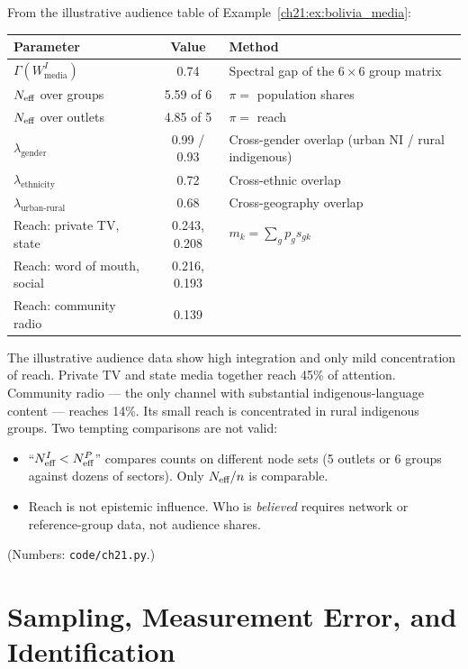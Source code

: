 \documentclass[../structural_economics_book.tex]{subfiles}
\begin{document}
\begin{example}\label{ch21:ex:parameters}
From the illustrative audience table of Example~\ref{ch21:ex:bolivia_media}:
\begin{center}
\small
\begin{tabularx}{\textwidth}{lcL}
\toprule
Parameter & Value & Method \\
\midrule
$\Gamma(W^I_{\text{media}})$ & 0.74 & Spectral gap of the $6 \times 6$ group matrix \\
$N_{\text{eff}}$ over groups & 5.59 of 6 & $\pi = $ population shares \\
$N_{\text{eff}}$ over outlets & 4.85 of 5 & $\pi = $ reach \\
$\lambda_{\text{gender}}$ & 0.99 / 0.93 & Cross-gender overlap (urban NI / rural indigenous) \\
$\lambda_{\text{ethnicity}}$ & 0.72 & Cross-ethnic overlap \\
$\lambda_{\text{urban-rural}}$ & 0.68 & Cross-geography overlap \\
Reach: private TV, state & 0.243, 0.208 & $m_k = \sum_g p_g s_{gk}$ \\
Reach: word of mouth, social & 0.216, 0.193 & \\
Reach: community radio & 0.139 & \\
\bottomrule
\end{tabularx}
\end{center}

The illustrative audience data show high integration and only mild concentration of reach. Private TV and state media together reach 45\% of attention. Community radio --- the only channel with substantial indigenous-language content --- reaches 14\%. Its small reach is concentrated in rural indigenous groups. Two tempting comparisons are not valid:
\begin{itemize}
\item ``$N_{\text{eff}}^I < N_{\text{eff}}^P$'' compares counts on different node sets (5 outlets or 6 groups against dozens of sectors). Only $N_{\text{eff}}/n$ is comparable.
\item Reach is not epistemic influence. Who is \emph{believed} requires network or reference-group data, not audience shares.
\end{itemize}
(Numbers: \texttt{code/ch21.py}.)
\end{example}


\section{Sampling, Measurement Error, and Identification}
\label{ch21:sec:measurement}
\end{document}
